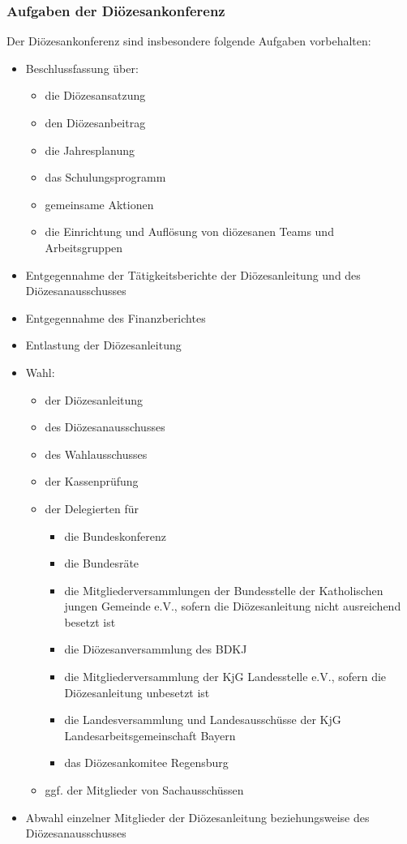 \documentclass[12pt]{report}
\begin{document}
\begin{justify}
\subsubsection{Aufgaben der Diözesankonferenz}
Der Diözesankonferenz sind insbesondere folgende Aufgaben vorbehalten:
\begin{itemize} 
  \item Beschlussfassung über:
    \begin{itemize} 
      \item die Diözesansatzung
      \item den Diözesanbeitrag
      \item die Jahresplanung
      \item das Schulungsprogramm
      \item gemeinsame Aktionen
      \item die Einrichtung und Auflösung von diözesanen Teams und Arbeitsgruppen
    \end{itemize}
  \item Entgegennahme der Tätigkeitsberichte der Diözesanleitung und des Diözesanausschusses
  \item Entgegennahme des Finanzberichtes
  \item Entlastung der Diözesanleitung
  \item Wahl:
    \begin{itemize}
      \item der Diözesanleitung
      \item des Diözesanausschusses
      \item des Wahlausschusses
      \item der Kassenprüfung
      \item der Delegierten für
            \begin{itemize}
              \item die Bundeskonferenz
              \item die Bundesräte
              \item die Mitgliederversammlungen der Bundesstelle der
                    Katholischen jungen Gemeinde e.V., sofern die
                    Diözesanleitung nicht ausreichend besetzt ist
              \item die Diözesanversammlung des BDKJ
              \item die Mitgliederversammlung der KjG Landesstelle e.V., sofern
                    die Diözesanleitung unbesetzt ist
              \item die Landesversammlung und Landesausschüsse der KjG Landesarbeitsgemeinschaft Bayern
              \item das Diözesankomitee Regensburg
            \end{itemize}
            \item ggf. der Mitglieder von Sachausschüssen
    \end{itemize}
  \item Abwahl einzelner Mitglieder der Diözesanleitung beziehungsweise des Diözesanausschusses
\end{itemize}

\end{justify}
\end{document}

